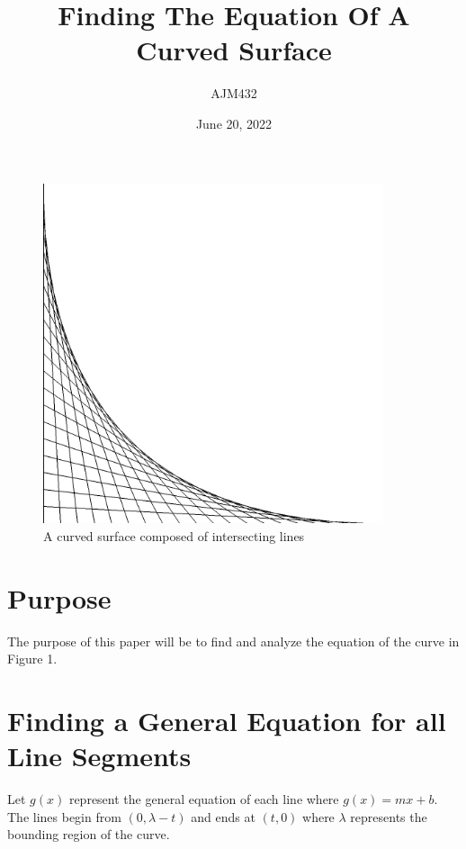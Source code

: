 \documentclass[12pt]{article}
\title{Finding The Equation Of A Curved Surface}
\author{AJM432}
\date{June 20, 2022}
\renewcommand\l[0]{\lambda}
\begin{document}
\maketitle	

\begin{figure}[htp]
    \centering
    \includegraphics[width=10cm]{curved_surface.png}
    \caption{A curved surface composed of intersecting lines}
    \vspace{4 cm}
\end{figure}

\section{Purpose}
The purpose of this paper will be to find and analyze the equation of the curve in Figure 1.

\section{Finding a General Equation for all Line Segments}
Let $g(x)$ represent the general equation of each line where $g(x)=mx+b$.
The lines begin from $(0, \l - t)$ and ends at $(t, 0)$ where $\l$ represents the bounding region of the curve.
\end{document}
